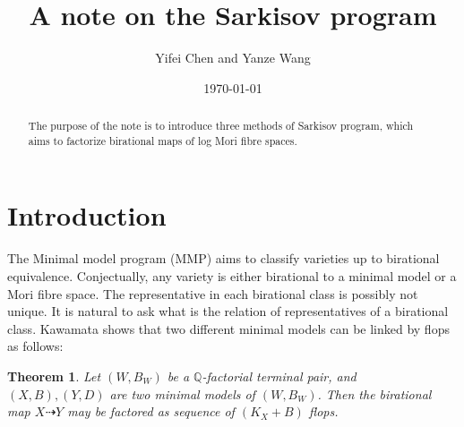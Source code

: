 \documentclass[11pt]{amsart}
\newtheorem{thm}[defn]{Theorem}
\begin{document}
\title{A note on the Sarkisov program}

\author{Yifei Chen and Yanze Wang}

\begin{abstract}
The purpose of the note is to introduce three methods of Sarkisov program, which aims to factorize birational maps of log Mori fibre spaces.
\end{abstract}
\address{Academy of Mathematics and Systems Science,
Chinese Academy of Sciences.
No. 55 Zhonguancun East Road, Haidian District,
Beijing 100190, P. R. China.}

\date{\today}


\maketitle

\tableofcontents


\section{Introduction}

The Minimal model program (MMP)  aims to classify varieties up to birational equivalence.
Conjectually, any variety is either birational to  a minimal model  or a Mori fibre space. The representative in each birational class is possibly not unique. It is natural to ask what is the relation of representatives of a birational class.
Kawamata shows that two different minimal models can be linked by flops as follows:
\begin{thm}
  \cite[Theorem 1]{kawamataFlopsConnectMinimal2008} Let $(W,B_W)$ be a $\mathbb{Q}$-factorial terminal pair, and $(X,B),(Y,D)$ are two minimal models of $(W,B_W)$. Then the birational map $X\dashrightarrow Y$ may be factored as sequence of $(K_X+B)$ flops. 
\end{thm}
\end{document}
